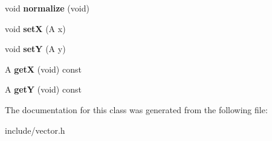\begin{DoxyCompactItemize}
\item 
\hypertarget{classVector2_ad79d33f5daea1609ff6bc0987a8c2c04}{}void {\bfseries normalize} (void)\label{classVector2_ad79d33f5daea1609ff6bc0987a8c2c04}

\item 
\hypertarget{classVector2_a4ad69b4de3149ae5d7841cb1674b8148}{}void {\bfseries set\+X} (A x)\label{classVector2_a4ad69b4de3149ae5d7841cb1674b8148}

\item 
\hypertarget{classVector2_adc7f988cadcfbe6eb59e2b911243f4c9}{}void {\bfseries set\+Y} (A y)\label{classVector2_adc7f988cadcfbe6eb59e2b911243f4c9}

\item 
\hypertarget{classVector2_a466ab83a9504df7ff8278070c010e86c}{}A {\bfseries get\+X} (void) const \label{classVector2_a466ab83a9504df7ff8278070c010e86c}

\item 
\hypertarget{classVector2_aee2b7977941bfada7b8871dc09c5cc23}{}A {\bfseries get\+Y} (void) const \label{classVector2_aee2b7977941bfada7b8871dc09c5cc23}

\end{DoxyCompactItemize}


The documentation for this class was generated from the following file\+:\begin{DoxyCompactItemize}
\item 
include/vector.\+h\end{DoxyCompactItemize}

